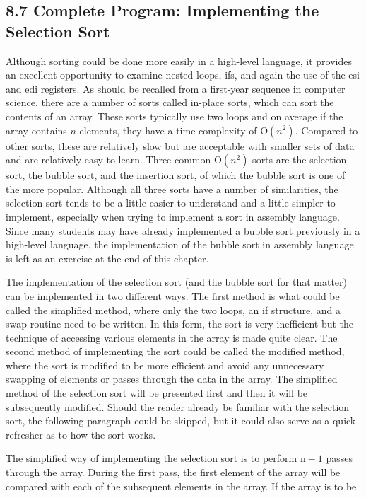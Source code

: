 \documentclass[10pt]{book}
\begin{document}
\begin{center}
\begin{center}
\begin{center}
\subsection*{8.7 Complete Program: Implementing the Selection Sort}
Although sorting could be done more easily in a high-level language, it provides an excellent opportunity to examine nested loops, ifs, and again the use of the esi and edi registers. As should be recalled from a first-year sequence in computer science, there are a number of sorts called in-place sorts, which can sort the contents of an array. These sorts typically use two loops and on average if the array contains $n$ elements, they have a time complexity of $\mathrm{O}\left(n^{2}\right)$. Compared to other sorts, these are relatively slow but are acceptable with smaller sets of data and are relatively easy to learn. Three common $\mathrm{O}\left(n^{2}\right)$ sorts are the selection sort, the bubble sort, and the insertion sort, of which the bubble sort is one of the more popular. Although all three sorts have a number of similarities, the selection sort tends to be a little easier to understand and a little simpler to implement, especially when trying to implement a sort in assembly language. Since many students may have already implemented a bubble sort previously in a high-level language, the implementation of the bubble sort in assembly language is left as an exercise at the end of this chapter.

The implementation of the selection sort (and the bubble sort for that matter) can be implemented in two different ways. The first method is what could be called the simplified method, where only the two loops, an if structure, and a swap routine need to be written. In this form, the sort is very inefficient but the technique of accessing various elements in the array is made quite clear. The second method of implementing the sort could be called the modified method, where the sort is modified to be more efficient and avoid any unnecessary swapping of elements or passes through the data in the array. The simplified method of the selection sort will be presented first and then it will be subsequently modified. Should the reader already be familiar with the selection sort, the following paragraph could be skipped, but it could also serve as a quick refresher as to how the sort works.

The simplified way of implementing the selection sort is to perform $\mathrm{n}-1$ passes through the array. During the first pass, the first element of the array will be compared with each of the subsequent elements in the array. If the array is to be\\


\end{center}
\end{center}
\end{center}
\end{document}
